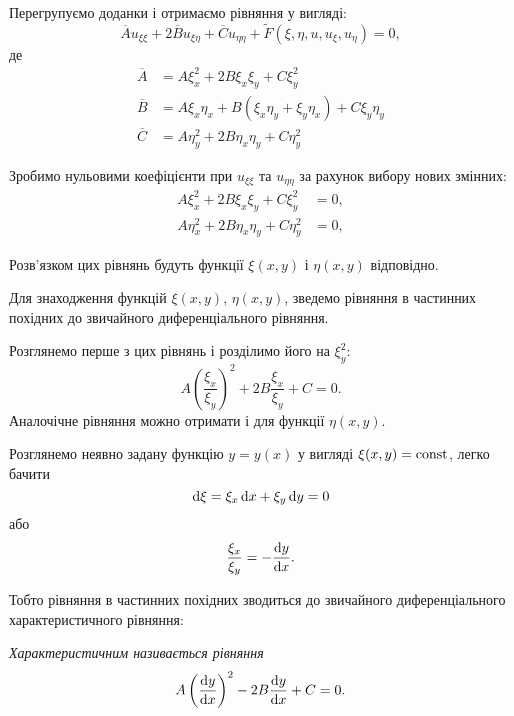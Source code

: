 Перегрупуємо доданки і отримаємо рівняння у вигляді:
\begin{equation}
	\overline{A} u_{\xi\xi} + 2\overline{B}u_{\xi\eta} + \overline{C} u_{\eta\eta} + \widetilde{F}(\xi,\eta,u,u_\xi,u_\eta)=0,
\end{equation}
де 
\begin{align}
	\overline{A} &= A \xi_x^2 + 2 B \xi_x \xi_y + C \xi_y^2 \\
	\overline{B} &= A \xi_x \eta_x + B(\xi_x \eta_y + \xi_y \eta_x) + C \xi_y \eta_y \\
	\overline{C} &= A \eta_y^2 + 2 B \eta_x \eta_y + C \eta_y^2
\end{align}

Зробимо нульовими коефіцієнти при $u_{\xi\xi}$ та $u_{\eta\eta}$ за рахунок вибору нових змінних:
\begin{align}
	A \xi_x^2 + 2 B \xi_x \xi_y + C \xi_y^2 &= 0, \\
	A \eta_x^2 + 2 B \eta_x \eta_y + C \eta_y^2 &= 0,
\end{align}

Розв'язком цих рівнянь будуть функції $\xi(x,y)$ і $\eta(x,y)$ відповідно. \medskip

Для знаходження функцій $\xi(x, y)$, $\eta(x,y)$, зведемо рівняння в частинних похідних до звичайного диференціального рівняння. \medskip

Розглянемо перше з цих рівнянь і розділимо його на $\xi_y^2$:
\begin{equation}
	A \left( \dfrac{\xi_x}{\xi_y} \right)^2 + 2 B \dfrac{\xi_x}{\xi_y} + C = 0.
\end{equation}
Аналочічне рівняння можно отримати і для функції  $\eta(x,y)$.

Розглянемо неявно задану функцію $y = y(x)$ у вигляді $\xi(x, y) = \operatorname{const}$, легко бачити
\begin{equation}
	\mathop{}\!\mathrm{d} \xi = \xi_x \mathop{}\!\mathrm{d} x + \xi_y \mathop{}\!\mathrm{d} y = 0
\end{equation}
або
\begin{equation}
	\dfrac{\xi_x}{\xi_y} = - \dfrac{\mathop{}\!\mathrm{d} y}{\mathop{}\!\mathrm{d} x}.
\end{equation}

Тобто рівняння в частинних похідних зводиться до звичайного диференціального характеристичного рівняння:
\begin{definition}
	\it{Характеристичним} називається рівняння
	\begin{equation}
		A \left( \dfrac{\mathop{}\!\mathrm{d} y}{\mathop{}\!\mathrm{d} x} \right)^2 - 2 B \dfrac{\mathop{}\!\mathrm{d} y}{\mathop{}\!\mathrm{d} x} + C = 0.
	\end{equation}
\end{definition}

